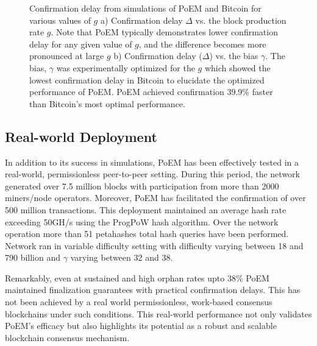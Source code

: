 \begin{figure}
\begin{subfigure}{0.49\textwidth}
    \label{fig:fg}
    \end{subfigure}
    \caption{Confirmation delay from simulations of PoEM and Bitcoin for various values of $g$ a) Confirmation delay $\Delta$ vs. the block production rate $g$. Note that PoEM typically demonstrates lower confirmation delay for any given value of $g$, and the difference becomes more pronounced at large $g$ b) Confirmation delay ($\Delta$) vs. the bias $\gamma$. The bias, $\gamma$ was experimentally optimized for the $g$ which showed the lowest confirmation delay in Bitcoin to elucidate the optimized performance of PoEM. PoEM achieved confirmation 39.9\% faster than Bitcoin's most optimal performance.}
    \label{fig:gamma}
\end{figure}

\subsection{Real-world Deployment} 
In addition to
its success in simulations, PoEM has been effectively tested in a real-world,
permissionless peer-to-peer setting. During this
period, the network generated over 7.5 million blocks with participation from
more than 2000 miners/node operators. Moreover, PoEM has facilitated the
confirmation of over 500 million transactions. This deployment maintained an
average hash rate exceeding 50GH/s using the ProgPoW hash algorithm. Over the
network operation more than 51 petahashes total hash queries have been performed.
Network ran in variable difficulty setting with difficulty varying between 18
and 790 billion and $\gamma$ varying between 32 and 38. 

Remarkably, even at sustained and high orphan rates upto 38\% PoEM maintained
finalization guarantees with practical confirmation delays. This has not been
achieved by a real world permissionless, work-based consensus blockchains under
such conditions. This real-world performance not only validates PoEM's efficacy
but also highlights its potential as a robust and scalable blockchain consensus
mechanism.
